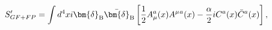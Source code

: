 \begin{equation}
  S_{GF+FP}' = \int d^4x i \bm{\delta}_{\rm B} \bar{\bm{\delta}}_{\rm B} \left[ 
{1 \over 2} A_\mu^a(x) A^\mu{}^a(x) - {\alpha \over 2}i C^a(x) \bar C^a(x) \right] ,
\label{GF1}
\end{equation}

